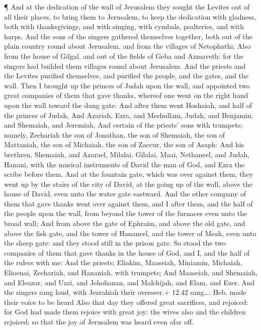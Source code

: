  ¶ And at the dedication of the wall of Jerusalem they
sought the Levites out of all their places, to bring them to Jerusalem,
to keep the dedication with gladness, both with thanksgivings, and with
singing, with cymbals, psalteries, and with harps.  And the
sons of the singers gathered themselves together, both out of the plain
country round about Jerusalem, and from the villages of Netophathi;
 Also from the house of Gilgal, and out of the fields of
Geba and Azmaveth: for the singers had builded them villages round about
Jerusalem.  And the priests and the Levites purified
themselves, and purified the people, and the gates, and the wall.
 Then I brought up the princes of Judah upon the wall, and
appointed two great companies of them that gave thanks, whereof one went
on the right hand upon the wall toward the dung gate:  And
after them went Hoshaiah, and half of the princes of Judah,
 And Azariah, Ezra, and Meshullam,  Judah, and
Benjamin, and Shemaiah, and Jeremiah,  And certain of the
priests' sons with trumpets; namely, Zechariah the son of Jonathan, the
son of Shemaiah, the son of Mattaniah, the son of Michaiah, the son of
Zaccur, the son of Asaph:  And his brethren, Shemaiah, and
Azarael, Milalai, Gilalai, Maai, Nethaneel, and Judah, Hanani, with the
musical instruments of David the man of God, and Ezra the scribe before
them.  And at the fountain gate, which was over against
them, they went up by the stairs of the city of David, at the going up
of the wall, above the house of David, even unto the water gate
eastward.  And the other company of them that gave thanks
went over against them, and I after them, and the half of the people
upon the wall, from beyond the tower of the furnaces even unto the broad
wall;  And from above the gate of Ephraim, and above the
old gate, and above the fish gate, and the tower of Hananeel, and the
tower of Meah, even unto the sheep gate: and they stood still in the
prison gate.  So stood the two companies of them that gave
thanks in the house of God, and I, and the half of the rulers with me:
 And the priests; Eliakim, Maaseiah, Miniamin, Michaiah,
Elioenai, Zechariah, and Hananiah, with trumpets;  And
Maaseiah, and Shemaiah, and Eleazar, and Uzzi, and Jehohanan, and
Malchijah, and Elam, and Ezer. And the singers sang loud, with Jezrahiah
their overseer.+ 12.42 sang\ldots: Heb. made their voice to be heard
 Also that day they offered great sacrifices, and rejoiced:
for God had made them rejoice with great joy: the wives also and the
children rejoiced: so that the joy of Jerusalem was heard even afar off.

